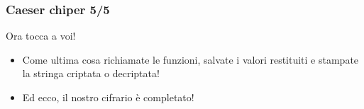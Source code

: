 \documentclass{beamer}
\begin{document}
\begin{frame}[fragile]
\frametitle{Caeser chiper 5/5}
\begin{block}{Ora tocca a voi!}
	\begin{itemize}
		\item Come ultima cosa richiamate le funzioni, salvate i valori restituiti e stampate la stringa criptata o decriptata!
		\item Ed ecco, il nostro cifrario è completato! 
	\end{itemize}
\end{block}

\end{frame}
\end{document}
